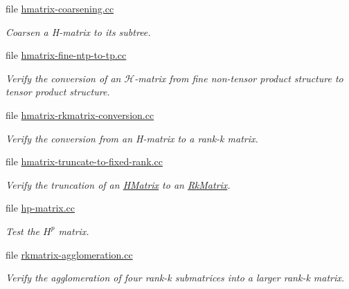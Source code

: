 \begin{DoxyCompactItemize}
file \hyperlink{hmatrix-coarsening_8cc}{hmatrix-\/coarsening.\+cc}
\begin{DoxyCompactList}\small\item\em Coarsen a H-\/matrix to its subtree. \end{DoxyCompactList}\item 
file \hyperlink{hmatrix-fine-ntp-to-tp_8cc}{hmatrix-\/fine-\/ntp-\/to-\/tp.\+cc}
\begin{DoxyCompactList}\small\item\em Verify the conversion of an $\mathcal{H}$-\/matrix from fine non-\/tensor product structure to tensor product structure. \end{DoxyCompactList}\item 
file \hyperlink{hmatrix-rkmatrix-conversion_8cc}{hmatrix-\/rkmatrix-\/conversion.\+cc}
\begin{DoxyCompactList}\small\item\em Verify the conversion from an H-\/matrix to a rank-\/k matrix. \end{DoxyCompactList}\item 
file \hyperlink{hmatrix-truncate-to-fixed-rank_8cc}{hmatrix-\/truncate-\/to-\/fixed-\/rank.\+cc}
\begin{DoxyCompactList}\small\item\em Verify the truncation of an \hyperlink{classHMatrix}{H\+Matrix} to an \hyperlink{classRkMatrix}{Rk\+Matrix}. \end{DoxyCompactList}\item 
file \hyperlink{hp-matrix_8cc}{hp-\/matrix.\+cc}
\begin{DoxyCompactList}\small\item\em Test the $H^p$ matrix. \end{DoxyCompactList}\item 
file \hyperlink{rkmatrix-agglomeration_8cc}{rkmatrix-\/agglomeration.\+cc}
\begin{DoxyCompactList}\small\item\em Verify the agglomeration of four rank-\/k submatrices into a larger rank-\/k matrix. \end{DoxyCompactList}\end{DoxyCompactItemize}
